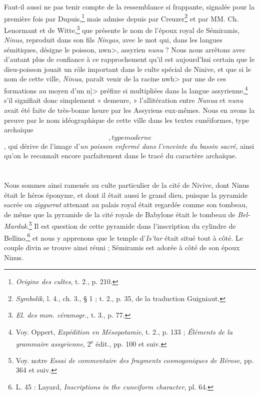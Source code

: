 \documentclass[a4paper, 11pt, oneside, landscape]{article}
\newcommand*\svgAAAA{}
\newcommand*\svgAAAB{}
\begin{document}
Faut-il aussi ne pas tenir compte de la ressemblance si frappante, signalée pour la première fois par Dupuis,\footnote{\emph{Origine des cultes}, t. 2., p. 210.} mais admise depuis par Creuzer\footnote{\emph{Symbolik}, l. 4., ch. 3., § 1 ; t. 2., p. 35, de la traduction Guigniaut.} et par MM. Ch. Lenormant et de Witte,\footnote{\emph{El. des mon. céramogr.}, t. 3., p. 77.} que présente le nom de l'époux royal de Sémiramis, \emph{Ninus}, reproduit dans son fils \emph{Ninyas}, avec le mot qui, dans les langues sémitiques, désigne le poisson, \<nwn>, assyrien \emph{nunu} ? Nous nous arrêtons avec d'autant plus de confiance à ce rapprochement qu'il est aujourd'hui certain que le dieu-poisson jouait un rôle important dans le culte spécial de Ninive, et que si le nom de cette ville, \emph{Ninua}, paraît venir de la racine \<nwh> par une de ces formations au moyen d'un \<n|> préfixe si multipliées dans la langue assyrienne,\footnote{Voy. Oppert, \emph{Expédition en Mésopotamie}, t. 2., p. 133 ; \emph{Éléments de la grammaire assyrienne}, 2\textsuperscript{e} édit., pp. 100 et suiv.} s'il signifiait donc simplement « demeure, » l'allitération entre \emph{Nunua} et \emph{nunu} avait été faite de très-bonne heure par les Assyriens eux-mêmes. Nous en avons la preuve par le nom idéographique de cette ville dans les textes cunéiformes, type archaïque $\svgAAAA$, type moderne $\svgAAAB$, qui dérive de l'image d'\emph{un poisson enfermé dans l'enceinte du bassin sacré}, ainsi qu'on le reconnaît encore parfaitement dans le tracé du caractère archaïque.

\bigskip \centerline{\EightStarTaper} \centerline{\EightStarTaper\EightStarTaper} \bigskip\clearpage
\section{}
\paragraph{}
Nous sommes ainsi ramenés au culte particulier de la cité de Nivive, dont Ninus était le héros éponyme, et dont il était aussi le grand dieu, puisque la pyramide sacrée ou \emph{ziggurrat} attenant au palais royal était regardée comme son tombeau, de même que la pyramide de la cité royale de Babylone était le tombeau de \emph{Bel-Marduk}.\footnote{Voy. notre \emph{Essai de commentaire des fragments cosmogoniques de Bérose}, pp. 364 et suiv.} Il est question de cette pyramide dans l'inscription du cylindre de Bellino,\footnote{L. 45 : Layard, \emph{Inscriptions in the cuneiform character}, pl. 64.} et nous y apprenons que le temple d'\emph{Is'tar} était situé tout à côté. Le couple divin se trouve ainsi réuni ; Sémiramis est adorée à côté de son époux Ninus.
\end{document}
